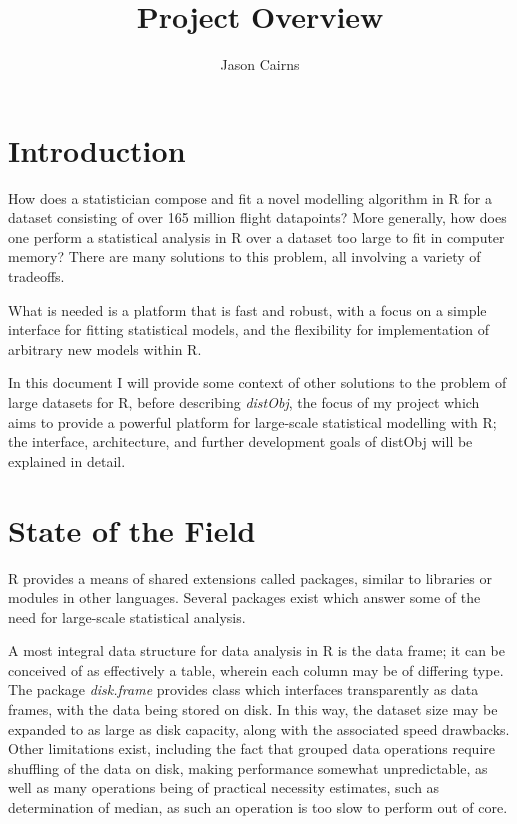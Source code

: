 \documentclass[a4paper,10pt]{article}
\begin{document}
\title{Project Overview}
\author{Jason Cairns}
  
\maketitle{}

\section{Introduction}

How does a statistician compose and fit a novel modelling algorithm in R for a
dataset consisting of over 165 million flight datapoints?
More generally, how does one perform a statistical analysis in R over a dataset
too large to fit in computer memory?
There are many solutions to this problem, all involving a variety of tradeoffs.

What is needed is a platform that is fast and robust, with a focus on a simple
interface for fitting statistical models, and the flexibility for
implementation of arbitrary new models within R.

In this document I will provide some context of other solutions to the problem
of large datasets for R, before describing \textit{distObj}, the focus of my
project which aims to provide a powerful platform for large-scale statistical
modelling with R; the interface, architecture, and further development goals of
distObj will be explained in detail.

\section{State of the Field}

R provides a means of shared extensions called packages, similar to libraries
or modules in other languages.
Several packages exist which answer some of the need for large-scale
statistical analysis.

A most integral data structure for data analysis in R is the data frame; it can
be conceived of as effectively a table, wherein each column may be of differing
type.
The package \textit{disk.frame} provides class which interfaces transparently
as data frames, with the data being stored on disk\cite{zj20}.
In this way, the dataset size may be expanded to as large as disk capacity,
along with the associated speed drawbacks\cite{zj19:_key}.
Other limitations exist, including the fact that grouped data operations
require shuffling of the data on disk, making performance somewhat
unpredictable, as well as many operations being of practical necessity
estimates, such as determination of median, as such an operation is too slow to
perform out of
core\cite{zj19:_group_by}\cite{zj19:_custom_one_stage_group_by_funct}.
\end{document}
